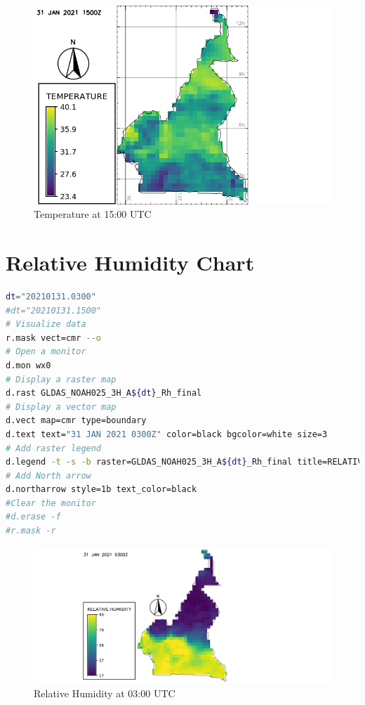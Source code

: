 \begin{figure}[H]
\begin{center}
\includegraphics[scale=0.6]{tp15a.png} %
\end{center}
\caption{Temperature at 15:00 UTC}
\label{Temperature at 15:00 UTC}%
\end{figure}

\section{Relative Humidity Chart}
\begin{lstlisting}[language=Bash]
dt="20210131.0300"
#dt="20210131.1500"
# Visualize data
r.mask vect=cmr --o
# Open a monitor
d.mon wx0
# Display a raster map
d.rast GLDAS_NOAH025_3H_A${dt}_Rh_final
# Display a vector map
d.vect map=cmr type=boundary
d.text text="31 JAN 2021 0300Z" color=black bgcolor=white size=3
# Add raster legend
d.legend -t -s -b raster=GLDAS_NOAH025_3H_A${dt}_Rh_final title=RELATIVE HUMIDITY title_fontsize=20 font=sans fontsize=18
# Add North arrow
d.northarrow style=1b text_color=black
#Clear the monitor
#d.erase -f
#r.mask -r
\end{lstlisting}

\begin{figure}[H]
\begin{center}
\includegraphics[scale=0.6]{rh03.png} %
\end{center}
\caption{Relative Humidity at 03:00 UTC}
\label{Relative Humidity at 03:00 UTC}%
\end{figure}

